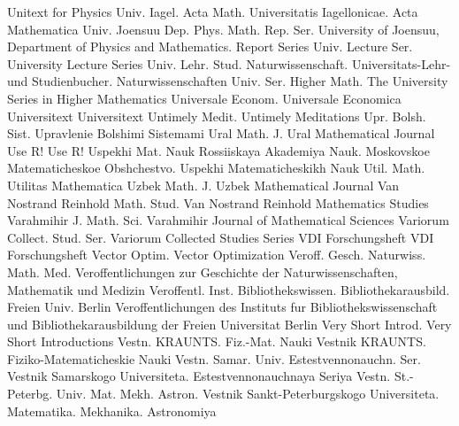 {Unitext for Physics}
{Univ. Iagel. Acta Math.}
{Universitatis Iagellonicae. Acta Mathematica}
{Univ. Joensuu Dep. Phys. Math. Rep. Ser.}
{University of Joensuu, Department of Physics and Mathematics. Report Series}
{Univ. Lecture Ser.}
{University Lecture Series}
{Univ. Lehr. Stud. Naturwissenschaft.}
{Universitats-Lehr- und Studienbucher. Naturwissenschaften}
{Univ. Ser. Higher Math.}
{The University Series in Higher Mathematics}
{Universale Econom.}
{Universale Economica}
{Universitext}
{Universitext}
{Untimely Medit.}
{Untimely Meditations}
{Upr. Bolsh. Sist.}
{Upravlenie Bolshimi Sistemami}
{Ural Math. J.}
{Ural Mathematical Journal}
{Use R!}
{Use R!}
{Uspekhi Mat. Nauk}
{Rossiiskaya Akademiya Nauk. Moskovskoe Matematicheskoe Obshchestvo. Uspekhi Matematicheskikh Nauk}
{Util. Math.}
{Utilitas Mathematica}
{Uzbek Math. J.}
{Uzbek Mathematical Journal}
{Van Nostrand Reinhold Math. Stud.}
{Van Nostrand Reinhold Mathematics Studies}
{Varahmihir J. Math. Sci.}
{Varahmihir Journal of Mathematical Sciences}
{Variorum Collect. Stud. Ser.}
{Variorum Collected Studies Series}
{VDI Forschungsheft}
{VDI Forschungsheft}
{Vector Optim.}
{Vector Optimization}
{Veroff. Gesch. Naturwiss. Math. Med.}
{Veroffentlichungen zur Geschichte der Naturwissenschaften, Mathematik und Medizin}
{Veroffentl. Inst. Bibliothekswissen. Bibliothekarausbild. Freien Univ. Berlin}
{Veroffentlichungen des Instituts fur Bibliothekswissenschaft und Bibliothekarausbildung der Freien Universitat Berlin}
{Very Short Introd.}
{Very Short Introductions}
{Vestn. KRAUNTS. Fiz.-Mat. Nauki}
{Vestnik KRAUNTS. Fiziko-Matematicheskie Nauki}
{Vestn. Samar. Univ. Estestvennonauchn. Ser.}
{Vestnik Samarskogo Universiteta. Estestvennonauchnaya Seriya}
{Vestn. St.-Peterbg. Univ. Mat. Mekh. Astron.}
{Vestnik Sankt-Peterburgskogo Universiteta. Matematika. Mekhanika. Astronomiya}
